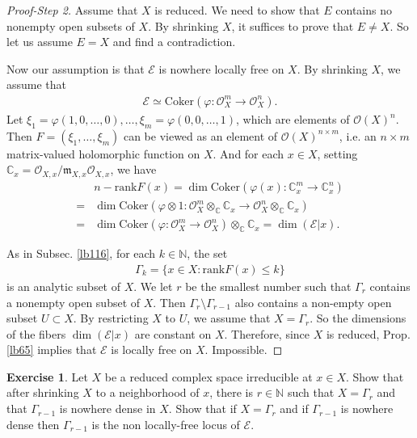 \documentclass[12pt,b5paper,notitlepage]{report}
\theoremstyle{definition}
\newtheorem{exe}[df]{Exercise}
\theoremstyle{plain}
\newcommand{\fk}{\mathfrak}
\newcommand{\scr}{\mathscr}
\newcommand{\Cbb}{\mathbb C}
\newcommand{\Nbb}{\mathbb N}
\newcommand{\Cok}{\mathrm{Coker}}
\newcommand{\rank}{\mathrm{rank}}
\numberwithin{equation}{section}
\begin{document}
\begin{proof}[Proof-Step 2]
Assume that $X$ is reduced. We need to show that $E$ contains no nonempty open subsets of $X$. By shrinking $X$, it suffices to prove that $E\neq X$. So let us assume $E=X$ and find a contradiction. 

Now our assumption is that $\scr E$ is nowhere locally free on $X$. By shrinking $X$, we assume that 
\begin{align*}
\scr E\simeq\Cok(\varphi:\scr O_X^m\rightarrow\scr O_X^n).
\end{align*}
Let $\xi_1=\varphi(1,0,\dots,0),\dots,\xi_m=\varphi(0,0,\dots,1)$, which are elements of $\scr O(X)^n$. Then $F=(\xi_1,\dots,\xi_m)$ can be viewed as an element of $\scr O(X)^{n\times m}$, i.e. an $n\times m$ matrix-valued holomorphic function on $X$. And for each $x\in X$, setting $\Cbb_x=\scr O_{X,x}/\fk m_{X,x}\scr O_{X,x}$, we have
\begin{align*}
&n-\rank F(x)=\dim\Cok(\varphi(x):\Cbb_x^m\rightarrow\Cbb_x^n)\\
=&\dim \Cok(\varphi\otimes 1:\scr O_X^m\otimes_\Cbb \Cbb_x\rightarrow\scr O_X^n\otimes_\Cbb \Cbb_x)\\
=&\dim \Cok(\varphi:\scr O_X^m\rightarrow\scr O_X^n)\otimes_\Cbb \Cbb_x=\dim(\scr E|x).
\end{align*}

As in Subsec. \ref{lb116}, for each $k\in\Nbb$, the set
\begin{align*}
\Gamma_k=\{x\in X:\rank F(x)\leq k\}
\end{align*}
is an analytic subset of $X$. We let $r$ be the smallest number such that $\Gamma_r$ contains a nonempty open subset of $X$. Then $\Gamma_r\setminus \Gamma_{r-1}$ also contains a non-empty open subset $U\subset X$. By restricting $X$ to $U$, we assume that $X=\Gamma_r$. So the dimensions of the fibers $\dim(\scr E|x)$ are constant on $X$. Therefore, since $X$ is reduced, Prop. \ref{lb65} implies that $\scr E$ is locally free on $X$. Impossible.
\end{proof}


\begin{exe}
Let $X$ be a reduced complex space irreducible at $x\in X$. Show that after shrinking $X$ to a neighborhood of $x$, there is $r\in\Nbb$ such that $X=\Gamma_r$ and that $\Gamma_{r-1}$ is nowhere dense in $X$. Show that if $X=\Gamma_r$ and if $\Gamma_{r-1}$ is nowhere dense then $\Gamma_{r-1}$ is the non locally-free locus of $\scr E$. 
\end{exe}
\end{document}

